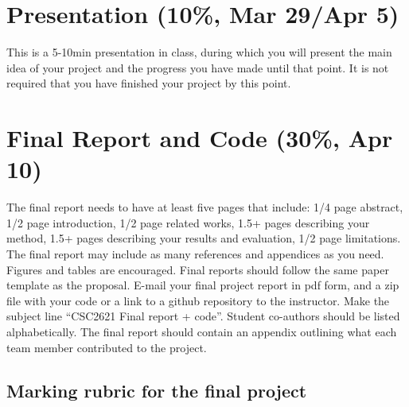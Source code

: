 \documentclass[a4paper,10pt]{article}
\begin{document}
\section{Presentation (10\%, Mar 29/Apr 5)}
This is a 5-10min presentation in class, during which you will present the main idea of your project and the progress you have made until that point. It is not required that you have finished your project by 
this point.   


\section{Final Report and Code  (30\%, Apr 10)}

The final report needs to have at least five pages that include: 1/4 page abstract, 1/2 page introduction, 1/2 page related works, 1.5+ pages describing your method, 1.5+ pages describing your results and evaluation,
1/2 page limitations. The final report may include as many references and appendices as you need. Figures and tables are encouraged. Final reports should follow the same paper template as the proposal. 
E-mail your final project report in pdf form, and a zip file with your code or a link to a github repository to the instructor. Make the subject line ``CSC2621 Final report + code''. Student co-authors should be 
listed alphabetically. The final report should contain an appendix outlining what each team member contributed to the project. 

\subsection{Marking rubric for the final project}
\end{document}
